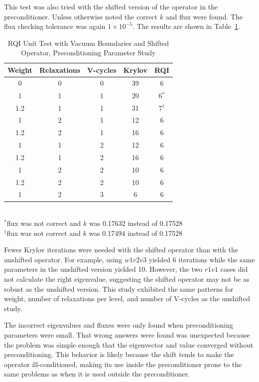 This test was also tried with the shifted version of the operator in the preconditioner. Unless otherwise noted the correct $k$ and flux were found. The flux checking tolerance was again $1 \times 10^{-5}$. The results are shown in Table~\ref{table:RQIUnitTestVacShifted}.
%
\begin{table}[!h]
\caption{RQI Unit Test with Vacuum Boundaries and Shifted Operator, Preconditioning Parameter Study}
\begin{center}
\begin{tabular}{| c | c | c | c | c |}
\hline
Weight & Relaxations & V-cycles & Krylov & RQI \\[0.5ex]
\hline
0    & 0 & 0 & 39 & 6 \\
1    & 1 & 1 & 20 & 6$^{*}$ \\
1.2 & 1 & 1 & 31 & 7$^{\dag}$ \\
1    & 2 & 1 & 12 & 6 \\
1.2 & 2 & 1 & 16 & 6 \\
1    & 1 & 2 & 12 & 6 \\
1.2 & 1 & 2 & 16 & 6 \\
1    & 2 & 2 & 10 & 6 \\
1.2 & 2 & 2 & 10 & 6 \\
1    & 2 & 3 & 6   & 6 \\
\hline 
\end{tabular}\\
$^{*}$flux was not correct and $k$ was 0.17632 instead of 0.17528 \\
 $^{\dag}$flux was not correct and $k$ was 0.17494 instead of 0.17528
\end{center}
\label{table:RQIUnitTestVacShifted}
\end{table}

Fewer Krylov iterations were needed with the shifted operator than with the unshifted operator. For example, using $w1r2v3$ yielded 6 iterations while the same parameters in the unshifted version yielded 10. However, the two $r1v1$ cases did not calculate the right eigenvalue, suggesting the shifted operator may not be as robust as the unshifted version. This study exhibited the same patterns for weight, number of relaxations per level, and number of V-cycles as the unshifted study. 

The incorrect eigenvalues and fluxes were only found when preconditioning parameters were small. That wrong answers were found was unexpected because the problem was simple enough that the eigenvector and value converged without preconditioning. This behavior is likely because the shift tends to make the operator ill-conditioned, making its use inside the preconditioner prone to the same problems as when it is used outside the preconditioner. 

